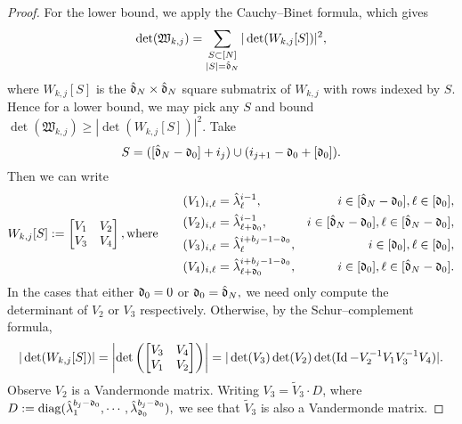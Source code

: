 \documentclass{amsart}
\numberwithin{equation}{section}
\def\corEE{\textcolor{amethyst}}
\def\corEE{}
\def\corABa{}
\def\corOZ{}
\begin{document}
\begin{proof}
\corEE{For the lower bound, we apply \corOZ{the} \corEE{Cauchy--Binet} \corOZ{formula}, which gives
  \begin{equation}
    \label{eq:cbin}
\det(\mathfrak{W}_{k,j})
= \sum_{\substack{S \subset [N] \\ |S| = \hat\gd_N}}
\corABa{|\det(W_{k,j}[S])|^2,}
\end{equation}
where $W_{k,j}[S]$ is the $\hat{\mathfrak{d}}_N \times \hat{\mathfrak{d}}_N$ square submatrix of $W_{k,j}$ with rows \corABa{indexed by} $S.$  Hence for a lower bound, we may pick any $S$ and bound
\(
\det(\mathfrak{W}_{k,j})
\geq
\corABa{|\det(W_{k,j}[S])|^2}.
\)
Take
\[
\corABa{ S = ([\hat\gd_N - \gd_0] + i_j) \cup (i_{j+1} -\gd_0 + [\gd_0]).}
\]
Then we can write
\corABa{
\[
  W_{k,j}[S] :=
  \begin{bmatrix}
    V_1 & V_2 \\
    V_3 & V_4
  \end{bmatrix},
  \text{where}
  \quad\quad
  \begin{aligned}
    (V_1)_{i,\ell} &= \hat{\lambda}_\ell^{i-1},
    &i \in [\hat{\mathfrak{d}}_N - \mathfrak{d}_0],\ell \in [\mathfrak{d}_0], \\
    (V_2)_{i,\ell} &= \hat{\lambda}_{\ell+\mathfrak{d}_0}^{i-1},
    &i \in [\hat{\mathfrak{d}}_N - \mathfrak{d}_0], \ell \in [\hat{\mathfrak{d}}_N - \mathfrak{d}_0],  \\
    (V_3)_{i,\ell} &= \hat{\lambda}_{\ell}^{i+b_j-1-\mathfrak{d}_0},
    &i \in [\mathfrak{d}_0], \ell \in [\mathfrak{d}_0],  \\
    (V_4)_{i,\ell} &= \hat{\lambda}_{\ell+\mathfrak{d}_0}^{i+b_j-1-\mathfrak{d}_0},
    &i \in [\mathfrak{d}_0], \ell \in [\hat{\mathfrak{d}}_N - \mathfrak{d}_0].  \\
  \end{aligned}
\]}
In the cases that either $\mathfrak{d}_0=0$ or $\mathfrak{d}_0 = \hat{\mathfrak{d}}_N,$ we need only compute the determinant of $V_2$ or $V_3$ respectively.
Otherwise, by the Schur--complement formula,
\begin{equation}
  \label{eq:wschur}
 \corABa{ |\det( W_{k,j}[S])| = \left|\det \left(\begin{bmatrix} V_3 & V_4 \\ V_1 & V_2\end{bmatrix}\right)\right|
  =|\det(V_3)\det(V_2)\det(\Id - V_2^{-1}V_1 V_3^{-1} V_4)|.}
\end{equation}
Observe $\corABa{V_2}$ is a Vandermonde matrix.
\corABa{Writing $V_3 = \tilde V_3 \cdot D$}, where
\corABa{\(
D := \operatorname{diag}(
\hat\lambda_{1}^{b_j-\mathfrak{d}_0},
\cdots,
\hat\lambda_{\mathfrak{d}_0}^{b_j-\mathfrak{d}_0}
),
\)
\corABa{we see} that $\tilde V_3$ is \corOZ{also}  a Vandermonde matrix}.}


\end{proof}
\end{document}

